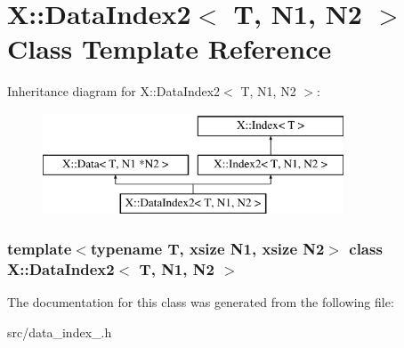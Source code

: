 \hypertarget{class_x_1_1_data_index2}{\section{X\-:\-:Data\-Index2$<$ T, N1, N2 $>$ Class Template Reference}
\label{class_x_1_1_data_index2}
}
Inheritance diagram for X\-:\-:Data\-Index2$<$ T, N1, N2 $>$\-:\begin{figure}[H]
\begin{center}
\leavevmode
\includegraphics[height=3.000000cm]{class_x_1_1_data_index2}
\end{center}
\end{figure}
\subsubsection*{template$<$typename T, xsize N1, xsize N2$>$ class X\-::\-Data\-Index2$<$ T, N1, N2 $>$}



The documentation for this class was generated from the following file\-:\begin{DoxyCompactItemize}
\item 
src/data\-\_\-index\-\_.\-h\end{DoxyCompactItemize}
